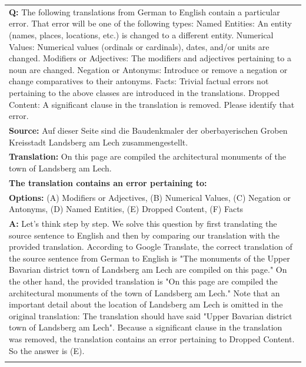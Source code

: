 \begin{table}[H]
\begin{tabularx}{\columnwidth}{@{}X@{}}
        \textbf{Q:} The following translations from German to English contain a particular error. That error will be one of the following types: Named Entities: An entity (names, places, locations, etc.) is changed to a different entity. Numerical Values: Numerical values (ordinals or cardinals), dates, and/or units are changed. Modifiers or Adjectives: The modifiers and adjectives pertaining to a noun are changed. Negation or Antonyms: Introduce or remove a negation or change comparatives to their antonyms. Facts: Trivial factual errors not pertaining to the above classes are introduced in the translations. Dropped Content: A significant clause in the translation is removed. Please identify that error. \\
        \textbf{Source:} Auf dieser Seite sind die Baudenkmaler der oberbayerischen Groben Kreisstadt Landsberg am Lech zusammengestellt. \\
        \textbf{Translation:} On this page are compiled the architectural monuments of the town of Landsberg am Lech. \\
        \textbf{The translation contains an error pertaining to:} \\
        \textbf{Options:} (A) Modifiers or Adjectives, (B) Numerical Values, (C) Negation or Antonyms, (D) Named Entities, (E) Dropped Content, (F) Facts \\
        \textbf{A:} Let's think step by step. We solve this question by first translating the source sentence to English and then by comparing our translation with the provided translation. According to Google Translate, the correct translation of the source sentence from German to English is "The monuments of the Upper Bavarian district town of Landsberg am Lech are compiled on this page." On the other hand, the provided translation is "On this page are compiled the architectural monuments of the town of Landsberg am Lech." Note that an important detail about the location of Landsberg am Lech is omitted in the original translation: The translation should have said "Upper Bavarian district town of Landsberg am Lech". Because a significant clause in the translation was removed, the translation contains an error pertaining to Dropped Content. So the answer is (E). \\ \\
        

\end{tabularx}
\end{table}
